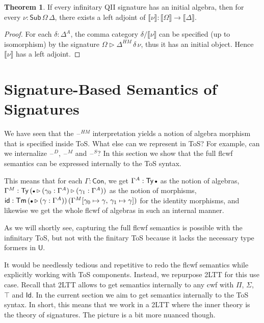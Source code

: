 \documentclass[12pt,a4paper,twoside,openany]{book}
\theoremstyle{remark}
\theoremstyle{definition}
\theoremstyle{theorem}
\newtheorem{theorem}{Theorem}
\newcommand{\id}{\mathsf{id}}
\newcommand{\Con}{\mathsf{Con}}
\newcommand{\Sub}{\mathsf{Sub}}
\newcommand{\Tm}{\mathsf{Tm}}
\newcommand{\Ty}{\mathsf{Ty}}
\newcommand{\U}{\mathsf{U}}
\newcommand{\Id}{\mathsf{Id}}
\newcommand{\blank}{\mathord{\hspace{1pt}\text{--}\hspace{1pt}}}
\newcommand{\ext}{\triangleright}
\newcommand{\emptycon}{\scaleobj{.75}\bullet}
\newcommand{\llb}{\llbracket}
\newcommand{\rrb}{\rrbracket}
\newcommand{\sem}[1]{\llb#1\rrb}
\begin{document}
\begin{theorem}
If every infinitary QII signature has an initial algebra, then for every $\nu :
\Sub\,\Omega\,\Delta$, there exists a left adjoint of $\sem{\nu} : \sem{\Omega}
\to \sem{\Delta}$.
\end{theorem}
\begin{proof}
For each $\delta : \Delta^A$, the comma category $\delta/\sem{\nu}$ can be
specified (up to isomorphism) by the signature $\Omega \ext
\Delta^{HM}\,\delta\,\nu$, thus it has an initial object. Hence $\sem{\nu}$ has
a left adjoint.
\end{proof}

\section{Signature-Based Semantics of Signatures}
\label{sec:signature-semantics}

We have seen that the $\blank^{HM}$ interpretation yields a notion of algebra
morphism that is specified inside ToS. What else can we represent in ToS? For
example, can we internalize $\blank^D$, $\blank^M$ and $\blank^S$? In this
section we show that the full flcwf semantics can be expressed internally to
the ToS syntax.

This means that for each $\Gamma : \Con$, we get $\Gamma^A : \Ty\,\emptycon$ as
the notion of algebras, $\Gamma^M : \Ty\,(\emptycon\ext(\gamma_0 :
\Gamma^A)\ext(\gamma_1 : \Gamma^A))$ as the notion of morphisms, $\id :
\Tm\,(\emptycon\ext(\gamma : \Gamma^A))\,(\Gamma^M[\gamma_0 \mapsto
  \gamma,\,\gamma_1 \mapsto \gamma])$ for the identity morphisms, and likewise
we get the whole flcwf of algebras in such an internal manner.

As we will shortly see, capturing the full flcwf semantics is possible with the
infinitary ToS, but not with the finitary ToS because it lacks the necessary
type formers in $\U$.

It would be needlessly tedious and repetitive to redo the flcwf semantics while
explicitly working with ToS components. Instead, we repurpose 2LTT for this use
case. Recall that 2LTT allows to get semantics internally to any cwf with $\Pi$,
$\Sigma$, $\top$ and $\Id$. In the current section we aim to get semantics
internally to the ToS syntax. In short, this means that we work in a 2LTT where
the inner theory is the theory of signatures. The picture is a bit more
nuanced though.
\end{document}

